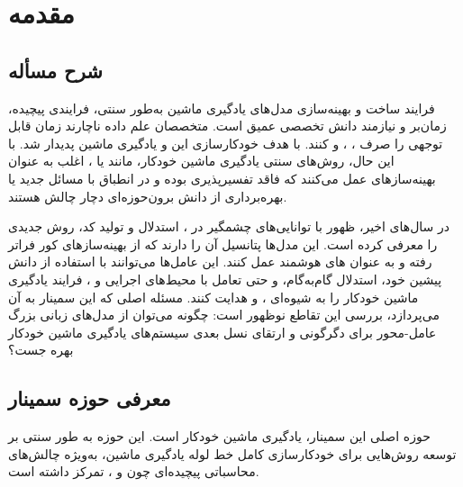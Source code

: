 
\chapter{مقدمه}
\thispagestyle{empty}

\section{شرح مسأله}
فرایند ساخت و بهینه‌سازی مدل‌های یادگیری ماشین به‌طور سنتی، فرایندی پیچیده، زمان‌بر و نیازمند دانش تخصصی عمیق است. متخصصان علم داده ناچارند زمان قابل توجهی را صرف ، ، و  کنند.  با هدف خودکارسازی این  و  یادگیری ماشین پدیدار شد. با این حال، روش‌های سنتی یادگیری ماشین خودکار، مانند  یا ، اغلب به عنوان  بهینه‌سازهای  عمل می‌کنند که فاقد تفسیرپذیری بوده و در انطباق با مسائل جدید یا بهره‌برداری از دانش برون‌حوزه‌ای دچار چالش هستند.

در سال‌های اخیر، ظهور  با توانایی‌های چشمگیر در ، استدلال و تولید کد، روش جدیدی را معرفی کرده است. این مدل‌ها پتانسیل آن را دارند که از بهینه‌سازهای کور فراتر رفته و به عنوان های هوشمند عمل کنند. این عامل‌ها می‌توانند با استفاده از دانش پیشین خود، استدلال گام‌به‌گام، و حتی تعامل با محیط‌های اجرایی و ، فرایند یادگیری ماشین خودکار را به شیوه‌ای ،  و  هدایت کنند. مسئله اصلی که این سمینار به آن می‌پردازد، بررسی این تقاطع نوظهور است: چگونه می‌توان از مدل‌های زبانی بزرگ عامل-محور برای دگرگونی و ارتقای نسل بعدی سیستم‌های یادگیری ماشین خودکار بهره جست؟

\section{معرفی حوزه سمینار}
حوزه اصلی این سمینار، یادگیری ماشین خودکار است. این حوزه به طور سنتی بر توسعه روش‌هایی برای خودکارسازی کامل خط لوله یادگیری ماشین، به‌ویژه چالش‌های محاسباتی پیچیده‌ای چون  و ، تمرکز داشته است.


